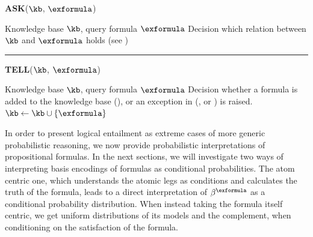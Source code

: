 \begin{algorithm}[hbt!]
    \caption{Contraction Knowledge Base with operations ASK and TELL}\label{alg:contractionKB}
    \vspace{0.3cm} \textbf{ASK}($\kb$, $\exformula$)
    \begin{algorithmic}
    \iosepline
    \Require Knowledge base $\kb$, query formula $\exformula$
    \Ensure Decision which relation between $\kb$ and $\exformula$ holds (see )
    \iosepline
        \State{$\hypercoreat{\formulavar} \algdefsymbol \contractionof{\{\secexformulaat{\shortcatvariables} \wcols \secexformula\in\kb\},\bencodingofat{\exformula}{\formulavar,\shortcatvariables}}{\formulavar}$}
            \State \Return {}
            \State \Return {}
            \State \Return {}
        \Else
            \State \Return {}
        \EndIf
    \vspace{0.1cm}
    \hrule
    \end{algorithmic}
    \vspace{0.3cm} \textbf{TELL}($\kb$, $\exformula$)
    \begin{algorithmic}
        \iosepline
    \Require Knowledge base $\kb$, query formula $\exformula$
    \Ensure Decision whether a formula is added to the knowledge base (), or an exception in (,  or ) is raised.
    \iosepline
            \State \Return {}
            \State \Return {}
            \State \Return {}
            \State $\kb \algdefsymbol \kb\cup\{\exformula\}$
            \State \Return {}
        \EndIf
    \end{algorithmic}

\end{algorithm}




In order to present logical entailment as extreme cases of more generic probabilistic reasoning, we now provide probabilistic interpretations of propositional formulas.
In the next sections, we will investigate two ways of interpreting basis encodings of formulas as conditional probabilities.
The atom centric one, which understands the atomic legs as conditions and calculates the truth of the formula, leads to a direct interpretation of $\bencodingof{\exformula}$ as a conditional probability distribution.
When instead taking the formula itself centric, we get uniform distributions of its models and the complement, when conditioning on the satisfaction of the formula.

